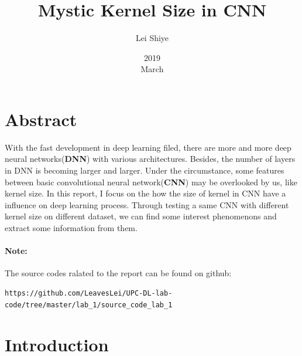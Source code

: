 \documentclass[a4paper,10pt]{article}
\begin{document}
%
   \title{Mystic Kernel Size in CNN}

   \author{Lei Shiye}
          
   \date{2019\\ March}

   \maketitle
 
  \newpage
    
\hypersetup{colorlinks=true, bookmarks, unicode}
\section*{Abstract}
With the fast development in deep learning filed, there are more and more deep 
neural networks(\textbf{DNN}) with various architectures. Besides, the number of 
layers in DNN is becoming larger and larger. Under the circumstance, some features 
between basic convolutional neural network(\textbf{CNN}) may be overlooked by us, 
like kernel size. In this report, I focus on the how the size of kernel in CNN have
a influence on deep learning process. Through testing a same CNN with different 
kernel size on different dataset, we can find some interest phenomenons and extract
some information from them. 


\paragraph{Note:}
The source codes ralated to the report can be found on github:
\begin{verbatim} 
https://github.com/LeavesLei/UPC-DL-lab-code/tree/master/lab_1/source_code_lab_1
\end{verbatim}

\section{Introduction}
\end{document}
